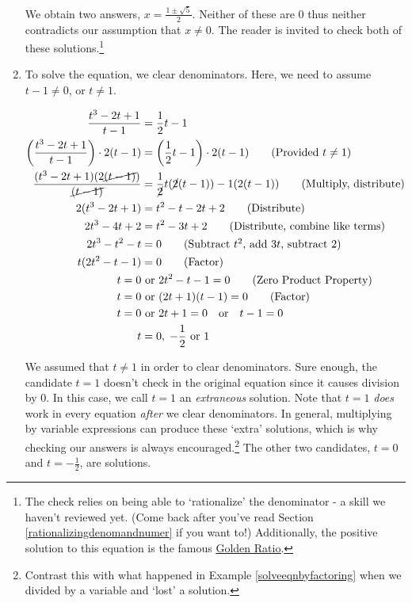 \begin{ex}
\begin{enumerate}
We obtain two answers, $x = \frac{1 \pm \sqrt{5}}{2}$.  Neither of these are $0$ thus neither contradicts our assumption that $x \neq 0$.  The reader is invited to check both of these solutions.\footnote{The check relies on being able to `rationalize' the denominator  - a skill we haven't reviewed yet. (Come back after you've read Section \ref{rationalizingdenomandnumer} if you want to!)  Additionally, the positive solution to this equation is the famous \href{http://en.wikipedia.org/wiki/Golden_ratio}{\underline{Golden Ratio}}.}

\item  To solve the equation, we clear denominators.  Here, we need to assume $t-1 \neq 0$, or $t \neq 1$.

\begin{align*}
\dfrac{t^3-2t+1}{t-1} & = \dfrac{1}{2}t-1 \\ 
\left(\dfrac{t^3-2t+1}{t-1}\right) \cdot 2(t-1) & = \left( \dfrac{1}{2}t-1 \right) \cdot 2(t-1) \tag{Provided $t \neq 1$} \\ 
\dfrac{(t^3-2t+1)(2\cancel{(t-1)})}{\cancel{(t-1)}}  & = \dfrac{1}{\cancel{2}} t (\cancel{2}(t-1)) - 1(2(t-1))  \tag{Multiply, distribute} \\ 
2(t^3-2t+1) & = t^2 - t - 2t + 2 \tag{Distribute} \\ 
2t^3 - 4t + 2 & = t^2 -3t + 2 \tag{Distribute, combine like terms} \\ 
2t^3 -t^2 - t & = 0 \tag{Subtract $t^2$, add $3t$, subtract $2$}\\ 
t(2t^2 -t - 1) & = 0 \tag{Factor} \\ 
t = 0 & \text{ or } 2t^2 - t - 1 = 0 \tag{Zero Product Property}\\
t = 0 & \text{ or } (2t+1)(t-1) = 0 \tag{Factor}\\
t = 0 & \text{ or } 2t+1 = 0 \quad \text{or} \quad t-1 = 0 \\
t & = 0, \; -\dfrac{1}{2} \text{ or } 1 \\
\end{align*}

We assumed that $t \neq 1$ in order to clear denominators.  Sure enough, the candidate $t = 1$ doesn't check in the original equation since it causes division by $0$.  In this case, we call $t = 1$ an \textit{extraneous} solution.  Note that $t=1$ \textit{does} work in every equation \textit{after} we clear denominators.  In general, multiplying by variable expressions can produce these `extra' solutions, which is why checking our answers is always encouraged.\footnote{Contrast this with what happened in  Example \ref{solveeqnbyfactoring} when we divided by a variable and `lost' a solution.}  The other two candidates, $t = 0$ and $t = -\frac{1}{2}$, are solutions.


\end{enumerate}
\end{ex}
